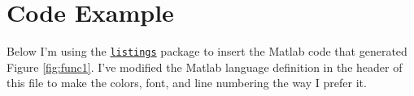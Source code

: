 \documentclass[letterpaper,10pt,twoside]{article}
\begin{document}
\section{Code Example}
\label{sec:code}

Below I'm using the \href{https://ctan.org/pkg/listings?lang=en}{\texttt{listings}} package to insert the Matlab code that generated Figure \ref{fig:func1}.
I've modified the Matlab language definition in the header of this file to make the colors, font, and line numbering the way I prefer it.




\printbibliography
\end{document}
